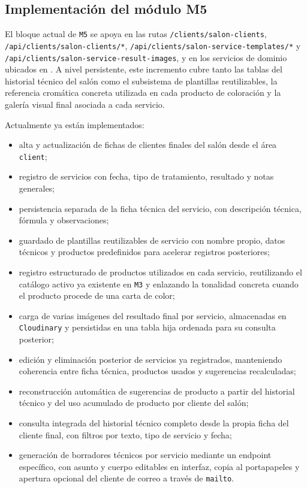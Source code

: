 \subsection{Implementación del módulo M5}

El bloque actual de \texttt{M5} se apoya en las rutas \texttt{/clients/salon-clients}, \texttt{/api/clients/salon-clients/*}, \texttt{/api/clients/salon-service-templates/*} y \texttt{/api/clients/salon-service-result-images}, y en los servicios de dominio ubicados en . A nivel persistente, este incremento cubre tanto las tablas del historial técnico del salón como el subsistema de plantillas reutilizables, la referencia cromática concreta utilizada en cada producto de coloración y la galería visual final asociada a cada servicio.

Actualmente ya están implementados:

\begin{itemize}
    \item alta y actualización de fichas de clientes finales del salón desde el área \texttt{client};
    \item registro de servicios con fecha, tipo de tratamiento, resultado y notas generales;
    \item persistencia separada de la ficha técnica del servicio, con descripción técnica, fórmula y observaciones;
    \item guardado de plantillas reutilizables de servicio con nombre propio, datos técnicos y productos predefinidos para acelerar registros posteriores;
    \item registro estructurado de productos utilizados en cada servicio, reutilizando el catálogo activo ya existente en \texttt{M3} y enlazando la tonalidad concreta cuando el producto procede de una carta de color;
    \item carga de varias imágenes del resultado final por servicio, almacenadas en \texttt{Cloudinary} y persistidas en una tabla hija ordenada para su consulta posterior;
    \item edición y eliminación posterior de servicios ya registrados, manteniendo coherencia entre ficha técnica, productos usados y sugerencias recalculadas;
    \item reconstrucción automática de sugerencias de producto a partir del historial técnico y del uso acumulado de producto por cliente del salón;
    \item consulta integrada del historial técnico completo desde la propia ficha del cliente final, con filtros por texto, tipo de servicio y fecha;
    \item generación de borradores técnicos por servicio mediante un endpoint específico, con asunto y cuerpo editables en interfaz, copia al portapapeles y apertura opcional del cliente de correo a través de \texttt{mailto}.
\end{itemize}


